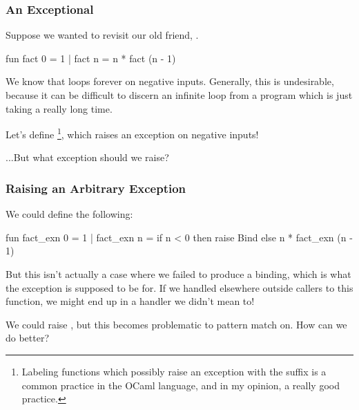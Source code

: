 \documentclass[aspectratio=169]{beamer}
\begin{document}


\begin{frame}[fragile]
  \frametitle{An Exceptional }

  Suppose we wanted to revisit our old friend, .

  \begin{codeblock}
    fun fact 0 = 1
      | fact n = n * fact (n - 1)
  \end{codeblock}

  \pause
  \vspace{\fill}

  We know that  loops forever on negative inputs. Generally,
  this is undesirable, because it can be difficult to discern an infinite
  loop from a program which is just taking a really long time.

  \pause
  \vspace{\fill}

  Let's define \footnote{
    Labeling functions which possibly raise an exception
    with the suffix  is a common practice in the OCaml language,
    and in my opinion, a really good practice.
  }, which raises an exception on negative inputs!

  \pause
  \vspace{\fill}

  ...But what exception should we raise?
\end{frame}

\begin{frame}[fragile]
  \frametitle{Raising an Arbitrary Exception}

  We could define the following:
  \begin{codeblock}
    fun fact_exn 0 = 1
      | fact_exn n =
          if n < 0 then
            raise Bind
          else
            n * fact_exn (n - 1)
  \end{codeblock}

  \pause
  \vspace{\fill}

  But this isn't actually a case where we failed to produce a binding, which
  is what the  exception is supposed to be for. If we handled
   elsewhere outside callers to this function, we might end up
  in a handler we didn't mean to!

  \pause
  \vspace{\fill}

  We could raise , but this becomes problematic
  to pattern match on. How can we do better?
\end{frame}
\end{document}
